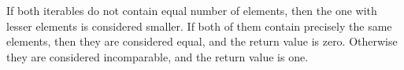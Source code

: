 If both iterables do not contain equal number of elements,
then the one with lesser elements is considered smaller.
If both of them contain precisely the same elements,
then they are considered equal, and the return value is zero.
Otherwise they are considered incomparable, and the return value is one.
